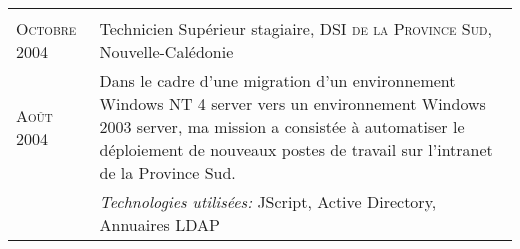 \begin{longtable}{R{2.5cm}|p{14.8cm}}
	                                                                                                                                                \\
	\textsc{Octobre 2004}   & Technicien Supérieur stagiaire, \textsc{DSI de la Province Sud}, Nouvelle-Calédonie                                                       \\
	\textsc{Août 2004}      & \footnotesize{Dans le cadre d'une migration d'un environnement Windows NT 4 server vers un environnement Windows
	2003 server, ma mission a consistée à automatiser le déploiement de nouveaux postes de travail sur l'intranet de la Province Sud. }                                 \\&
	\footnotesize{\emph{Technologies utilisées:} JScript, Active Directory, Annuaires LDAP}                                                                             \\
\end{longtable}